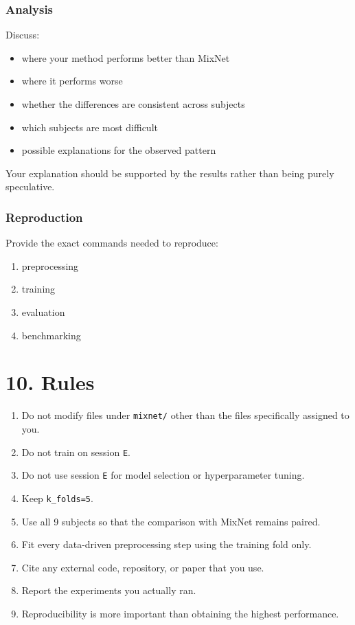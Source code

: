 \documentclass[
  10pt,
]{article}
\begin{document}
\subsubsection{Analysis}\label{analysis}

Discuss:

\begin{itemize}
\item
  where your method performs better than MixNet
\item
  where it performs worse
\item
  whether the differences are consistent across subjects
\item
  which subjects are most difficult
\item
  possible explanations for the observed pattern
\end{itemize}

Your explanation should be supported by the results rather than being
purely speculative.

\subsubsection{Reproduction}\label{reproduction}

Provide the exact commands needed to reproduce:

\begin{enumerate}
\def\labelenumi{\arabic{enumi}.}
\item
  preprocessing
\item
  training
\item
  evaluation
\item
  benchmarking
\end{enumerate}

\section{10. Rules}\label{rules}

\begin{enumerate}
\def\labelenumi{\arabic{enumi}.}
\item
  Do not modify files under \texttt{mixnet/} other than the files
  specifically assigned to you.
\item
  Do not train on session \texttt{E}.
\item
  Do not use session \texttt{E} for model selection or hyperparameter
  tuning.
\item
  Keep \texttt{k\_folds=5}.
\item
  Use all 9 subjects so that the comparison with MixNet remains
  paired.
\item
  Fit every data-driven preprocessing step using the training fold
  only.
\item
  Cite any external code, repository, or paper that you use.
\item
  Report the experiments you actually ran.
\item
  Reproducibility is more important than obtaining the highest
  performance.
\end{enumerate}
\end{document}

